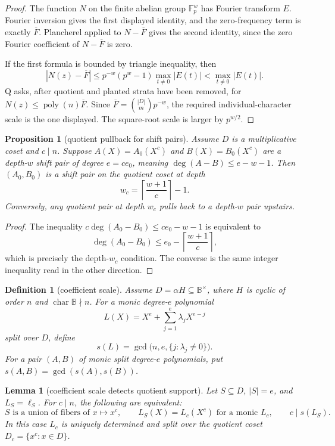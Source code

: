 \documentclass[a4paper,11pt]{amsart}
\newtheorem{lemma}[theorem]{Lemma}
\newtheorem{proposition}[theorem]{Proposition}
\newtheorem{definition}[theorem]{Definition}
\theoremstyle{remark}
\newcommand{\F}{\mathbb F}
\newcommand{\B}{\mathbb B}
\newcommand{\poly}{\operatorname{poly}}
\begin{document}
\begin{proof}
The function \(N\) on the finite abelian group \(\F_p^w\) has Fourier transform \(E\).  Fourier inversion gives the first displayed identity, and the zero-frequency term is exactly \(\overline F\).  Plancherel applied to \(N-\overline F\) gives the second identity, since the zero Fourier coefficient of \(N-\overline F\) is zero.

If the first formula is bounded by triangle inequality, then
\[
        |N(z)-\overline F|\le p^{-w}(p^w-1)\max_{t\ne0}|E(t)|<\max_{t\ne0}|E(t)|.
\]
Q asks, after quotient and planted strata have been removed, for \(N(z)\le\poly(n)\overline F\).  Since \(\overline F=\binom{|D|}{m}p^{-w}\), the required individual-character scale is the one displayed.  The square-root scale is larger by \(p^{w/2}\).
\end{proof}

\begin{proposition}[quotient pullback for shift pairs]\label{prop:sp-pullback}
Assume \(D\) is a multiplicative coset and \(c\mid n\).  Suppose \(A(X)=A_0(X^c)\) and \(B(X)=B_0(X^c)\) are a depth-\(w\) shift pair of degree \(e=ce_0\), meaning \(\deg(A-B)\le e-w-1\).  Then \((A_0,B_0)\) is a shift pair on the quotient coset at depth
\[
        w_c=\left\lceil\frac{w+1}{c}\right\rceil-1.
\]
Conversely, any quotient pair at depth \(w_c\) pulls back to a depth-\(w\) pair upstairs.
\end{proposition}

\begin{proof}
The inequality \(c\deg(A_0-B_0)\le ce_0-w-1\) is equivalent to
\[
        \deg(A_0-B_0)\le e_0-\left\lceil\frac{w+1}{c}\right\rceil,
\]
which is precisely the depth-\(w_c\) condition.  The converse is the same integer inequality read in the other direction.
\end{proof}

\begin{definition}[coefficient scale]\label{def:coefficient-scale}
Assume \(D=\alpha H\subseteq\B^\times\), where \(H\) is cyclic of order \(n\) and \(\operatorname{char}\B\nmid n\).  For a monic degree-\(e\) polynomial
\[
        L(X)=X^e+\sum_{j=1}^e \lambda_jX^{e-j}
\]
split over \(D\), define
\[
        s(L)=\gcd\bigl(n,e,\{j:\lambda_j\ne0\}\bigr).
\]
For a pair \((A,B)\) of monic split degree-\(e\) polynomials, put \(s(A,B)=\gcd(s(A),s(B))\).
\end{definition}

\begin{lemma}[coefficient scale detects quotient support]\label{lem:coeff-scale}
Let \(S\subseteq D\), \(|S|=e\), and \(L_S=\ell_S\).  For \(c\mid n\), the following are equivalent:
\[
        S\text{ is a union of fibers of }x\mapsto x^c,\qquad
        L_S(X)=L_c(X^c)\text{ for a monic }L_c,\qquad
        c\mid s(L_S).
\]
In this case \(L_c\) is uniquely determined and split over the quotient coset \(D_c=\{x^c:x\in D\}\).
\end{lemma}
\end{document}
